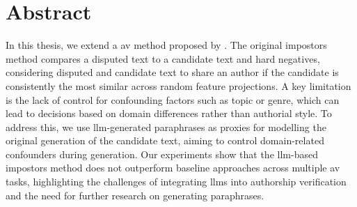 \chapter*{Abstract}

In this thesis, we extend a \acl{av} method proposed by \citet{koppel_determining_2014}. 
The original impostors method compares a disputed text to a candidate text and hard negatives, considering disputed and candidate text to share an author if the candidate is consistently the most similar across random feature projections. 
A key limitation is the lack of control for confounding factors such as topic or genre, which can lead to decisions based on domain differences rather than authorial style. 
To address this, we use \acs{llm}-generated paraphrases as proxies for modelling the original generation of the candidate text, aiming to control domain-related confounders during \imp{} generation. 
Our experiments show that the \acs{llm}-based impostors method does not outperform baseline approaches across multiple \acl{av} tasks, highlighting the challenges of integrating \acsp{llm} into authorship verification and the need for further research on generating paraphrases.
